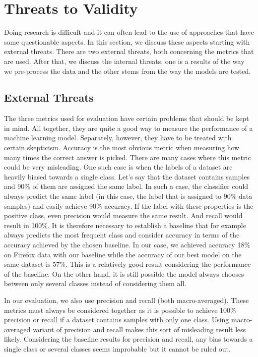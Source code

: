 \section{Threats to Validity}

Doing research is difficult and it can often lead to the use of approaches that have some questionable aspects. In this section, we discuss these aspects starting with external threats. There are two external threats, both concerning the metrics that are used. After that, we discuss the internal threats, one is a results of the way we pre-process the data and the other stems from the way the models are tested.

\subsection{External Threats}

The three metrics used for evaluation have certain problems that should be kept in mind. All together, they are quite a good way to measure the performance of a machine learning model. Separately, however, they have to be treated with certain skepticism. Accuracy is the most obvious metric when measuring how many times the correct answer is picked. There are many cases where this metric could be very misleading. One such case is when the labels of a dataset are heavily biased towards a single class. Let's say that the dataset contains samples and 90\% of them are assigned the same label. In such a case, the classifier could always predict the same label (in this case, the label that is assigned to 90\% data samples) and easily achieve 90\% accuracy. If the label with these properties is the positive class, even precision would measure the same result. And recall would result in 100\%. It is therefore necessary to establish a baseline that for example always predicts the most frequent class and consider accuracy in terms of the accuracy achieved by the chosen baseline. In our case, we achieved accuracy 18\% on Firefox data with our baseline while the accuracy of our best model on the same dataset is 57\%. This is a relatively good result considering the performance of the baseline. On the other hand, it is still possible the model always chooses between only several classes instead of considering them all.

In our evaluation, we also use precision and recall (both macro-averaged). These metrics must always be considered together as it is possible to achieve 100\% precision or recall if a dataset contains samples with only one class. Using macro-averaged variant of precision and recall makes this sort of misleading result less likely. Considering the baseline results for precision and recall, any bias towards a single class or several classes seems improbable but it cannot be ruled out.

